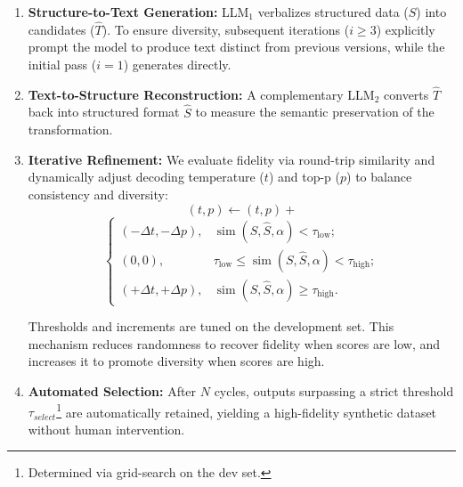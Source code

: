 \documentclass[11pt]{article}
\begin{document}
\begin{enumerate}
    \item \textbf{Structure-to-Text Generation:} LLM$_1$ verbalizes structured data ($S$) into candidates ($\hat T$). To ensure diversity, subsequent iterations ($i \ge 3$) explicitly prompt the model to produce text distinct from previous versions, while the initial pass ($i=1$) generates directly. 

    \item \textbf{Text-to-Structure Reconstruction:} A complementary LLM$_2$ converts $\hat T$ back into structured format $\hat{S}$ to measure the semantic preservation of the transformation.

    \item \textbf{Iterative Refinement:} We evaluate fidelity via round-trip similarity and dynamically adjust decoding temperature ($t$) and top-p ($p$) to balance consistency and diversity:
 \[(t, p)\leftarrow(t,p)+
\]
\[
\begin{cases}
(-\Delta t,-\Delta p), & \operatorname{sim}(S,\hat{S}, \alpha)<\tau_{\text{low}};\\[2pt]
(0,0), & \tau_{\text{low}}\le \operatorname{sim}(S,\hat{S}, \alpha)<\tau_{\text{high}};\\[2pt]
(+\Delta t,+\Delta p), & \operatorname{sim}(S,\hat{S}, \alpha)\ge\tau_{\text{high}}.
\end{cases}
\]

    Thresholds and increments are tuned on the development set. This mechanism reduces randomness to recover fidelity when scores are low, and increases it to promote diversity when scores are high.

    \item \textbf{Automated Selection:} After $N$ cycles, outputs surpassing a strict threshold $\tau_{select}$\footnote{Determined via grid-search on the dev set.} are automatically retained, yielding a high-fidelity synthetic dataset without human intervention.
\end{enumerate}

\end{document}
